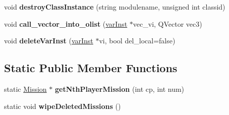 \begin{DoxyCompactItemize}
\item 
void {\bfseries destroy\+Class\+Instance} (string modulename, unsigned int classid)\hypertarget{classMission_af758268ee0d81f31c7d4acd846679f92}{}\label{classMission_af758268ee0d81f31c7d4acd846679f92}

\item 
void {\bfseries call\+\_\+vector\+\_\+into\+\_\+olist} (\hyperlink{classvarInst}{var\+Inst} $\ast$vec\+\_\+vi, Q\+Vector vec3)\hypertarget{classMission_af5e6667a1e0a98455b0716e5df7cf9d4}{}\label{classMission_af5e6667a1e0a98455b0716e5df7cf9d4}

\item 
void {\bfseries delete\+Var\+Inst} (\hyperlink{classvarInst}{var\+Inst} $\ast$vi, bool del\+\_\+local=false)\hypertarget{classMission_af018b400201dcbfd33631a3649bd2a86}{}\label{classMission_af018b400201dcbfd33631a3649bd2a86}

\end{DoxyCompactItemize}
\subsection*{Static Public Member Functions}
\begin{DoxyCompactItemize}
\item 
static \hyperlink{classMission}{Mission} $\ast$ {\bfseries get\+Nth\+Player\+Mission} (int cp, int num)\hypertarget{classMission_a38d44146199b90ba2d8f5785890d23fd}{}\label{classMission_a38d44146199b90ba2d8f5785890d23fd}

\item 
static void {\bfseries wipe\+Deleted\+Missions} ()\hypertarget{classMission_a8e418f307d1bfa2f6d3a819c6ac0b1a0}{}\label{classMission_a8e418f307d1bfa2f6d3a819c6ac0b1a0}

\end{DoxyCompactItemize}
